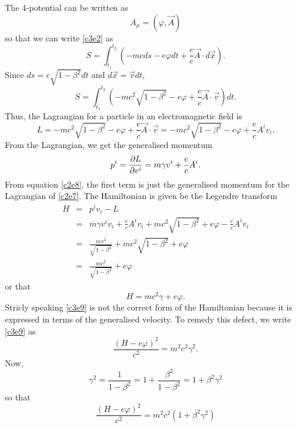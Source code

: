 \begin{enumerate}
The 4-potential can be written as 
\begin{equation}\label{c3e3}
A_\mu = (\varphi, \vec{A})
\end{equation}
so that we can write \eqref{c3e2} as
\begin{equation}\label{c3e4}
S = \int_{t_1}^{t_2}\left(-mcds - e\varphi dt + 
\frac{e}{c}\vec{A}\cdot d\vec{x}\right).
\end{equation}
Since $ds = c\sqrt{1 - \beta^2}dt$ and $d\vec{x} = \vec{v}dt$,
\begin{equation}\label{c3e5}
S = \int_{t_1}^{t_2}\left(-mc^2\sqrt{1 - \beta^2} - e\varphi + 
\frac{e}{c}\vec{A}\cdot\vec{v}\right)dt.
\end{equation}
Thus, the Lagrangian for a particle in an electromagnetic field is
\begin{equation}\label{c3e6}
L = -mc^2\sqrt{1 - \beta^2} - e\varphi + \frac{e}{c}\vec{A}\cdot\vec{v}
= -mc^2\sqrt{1 - \beta^2} - e\varphi + \frac{e}{c}A^i v_i.
\end{equation}
From the Lagrangian, we get the generalised momentum
\begin{equation}\label{c3e7}
p^i = \frac{\partial{L}}{\partial{v^i}} = m\gamma v^i + \frac{e}{c}A^i.
\end{equation}
From equation \eqref{c2e8}, the first term is just the generalised momentum for
the Lagrangian of \eqref{c2e7}. The Hamiltonian is given be the Legendre
transform
\begin{eqnarray*}
H &=& p^iv_i - L \\
  &=& m\gamma v^iv_i + \frac{e}{c}A^iv_i + mc^2\sqrt{1 - \beta^2} + e\varphi - 
  \frac{e}{c}A^iv_i \\
  &=& \frac{mv^2}{\sqrt{1 - \beta^2}} + mc^2\sqrt{1 - \beta^2} + e\varphi \\
  &=& \frac{mc^2}{\sqrt{1 - \beta^2}} + e\varphi
\end{eqnarray*}
or that
\begin{equation}\label{c3e8}
H = mc^2\gamma + e\varphi.
\end{equation}
Stricly speaking \eqref{c3e9} is not the correct form of the Hamiltonian because 
it is expressed in terms of the generalised velocity. To remedy this defect, we 
write
\eqref{c3e9} as
\[
\frac{(H - e\varphi)^2}{c^2} = m^2c^2 \gamma^2.
\]
Now,
\begin{equation}\label{c3e9}
\gamma^2 = \frac{1}{1 - \beta^2} = 1 + \frac{\beta^2}{1 - \beta^2} = 
1 + \beta^2\gamma^2
\end{equation}
so that
\[
\frac{(H - e\varphi)^2}{c^2} = m^2c^2(1 + \beta^2\gamma^2) 
\]
\end{enumerate}
